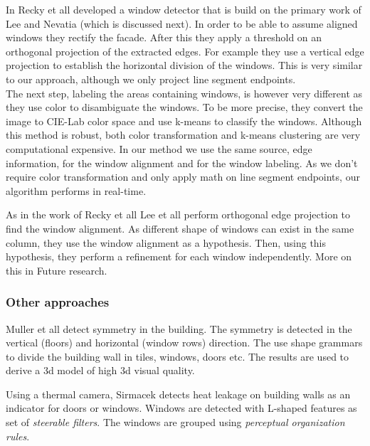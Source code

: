 In \cite{Recky_kmeans} Recky et all developed a window detector that is build on
the primary work of Lee and Nevatia \cite{Lee_extraction} (which is discussed
next).
In order to be able to assume aligned windows they rectify the facade.  After this they apply a threshold on an orthogonal projection of the extracted edges. 
For example they use a vertical edge projection to establish the horizontal division of the windows.
This is very similar to our approach, although we only project line segment endpoints.\\
The next step, labeling the areas containing windows, is however very different as they use color to disambiguate the windows.
To be more precise, they convert the image to CIE-Lab color space and use k-means to classify the windows.
Although this method is robust, both color transformation and k-means clustering are very computational expensive.
In our method we use the same source, edge information, for the window alignment and for the window labeling.
As we don't require color transformation and only apply math on line segment
endpoints, our algorithm performs in real-time.

As in the work of Recky et all \cite{Recky_kmeans} Lee et all
\cite{Lee_extraction}
perform orthogonal edge projection to find the window alignment.  As different
shape of windows can exist in the same column, they use the window alignment as
a hypothesis.  Then, using this hypothesis, they perform a refinement for each
window independently. More on this in Future research.



\subsubsection{Other approaches}
Muller et all \cite{Muller_procedural} detect symmetry in the building. The
symmetry is detected in the vertical (floors) and horizontal (window
rows) direction.
The use shape grammars to divide the building wall in tiles, windows, doors etc.
The results are used to derive a 3d model of high 3d visual quality.

Using a thermal camera, Sirmacek \cite{Sirmacek_thermal}
detects heat leakage on building walls as an indicator for doors or windows.
Windows are detected with L-shaped features as set of \emph{steerable filters}.
The windows are grouped using \emph{perceptual organization rules}.

